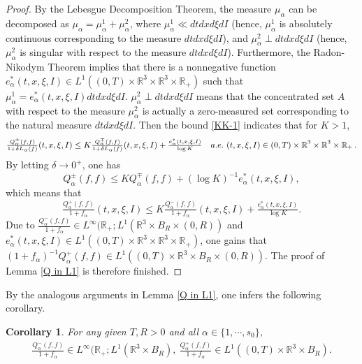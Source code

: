 \documentclass[reqno,11pt]{amsart}
\newtheorem{corollary}{Corollary}[section]
\numberwithin{equation}{section}
\def\R{\mathbb{R}}
\begin{document}
\begin{proof}
By the Lebesgue Decomposition Theorem, the measure $\mu_\alpha$ can be decomposed as $\mu_\alpha = \mu_\alpha^1 + \mu_\alpha^2$, where $\mu_\alpha^1 \ll d t d x d \xi d I$ (hence, $\mu_\alpha^1$ is absolutely continuous corresponding to the measure $ d t d x d \xi d I $), and $\mu_\alpha^2 \perp d t d x d \xi d I$ (hence, $\mu_\alpha^2$ is singular with respect to the measure $ d t d x d \xi d I $). Furthermore, the Radon-Nikodym Theorem implies that there is a nonnegative function $e_\alpha^* (t,x,\xi,I) \in L^1 ( (0,T) \times \R^3 \times \R^3 \times \R_+ )$ such that $ \mu_\alpha^1 = e_\alpha^* (t,x,\xi,I) d t d x d \xi d I $. $\mu_\alpha^2 \perp d t d x d \xi d I$ means that the concentrated set $A$ with respect to the measure $\mu_\alpha^2$ is actually a zero-measured set corresponding to the natural measure $d t d x d \xi d I$. Then the bound \eqref{KK-1} indicates that for $K > 1$,
\begin{equation*}{\small
  \begin{aligned}
    \tfrac{Q^\pm _{\alpha}(f,f)}{1+\delta L_{\alpha}(f)} (t,x,\xi,I) \leq K \tfrac{Q^\mp _{\alpha}(f,f)}{1+\delta L_{\alpha}(f)} (t,x,\xi,I) + \tfrac{e_\alpha^*(t,x,\xi,I)}{\log K} \quad a.e. \ (t,x,\xi,I) \in (0, T) \times \R^3 \times \R^3 \times \R_+ \,.
  \end{aligned}}
\end{equation*}
By letting $\delta \to 0^+$, one has
	\begin{equation}\label{AK-bnd}
		Q^\pm_\alpha (f,f) \leq K Q^\mp_\alpha (f,f) + ( \log K )^{-1} e_\alpha^* (t,x,\xi,I) ,
	\end{equation}
which means that
	\begin{equation*}
		\tfrac{Q^+_\alpha (f,f)}{1+f_\alpha}(t,x,\xi,I) \leq K \tfrac{Q^-_\alpha (f,f)}{1+f_\alpha}(t,x,\xi,I)+ \tfrac{e_\alpha^* (t,x,\xi,I)}{\log K}.
	\end{equation*}
Due to $\tfrac{Q^-_\alpha (f,f)}{1+f_\alpha}\in L^\infty(\R_+ ; L^1( \R^3 \times B_R \times (0,R))$ and $e_\alpha^* (t,x,\xi,I) \in L^1 ( (0,T) \times \R^3 \times \R^3 \times \R_+ )$, one gains that $(1+f_\alpha)^{-1}Q^+_\alpha (f,f)\in L^1((0,T)\times \R^3 \times B_R\times (0,R))$. The proof of Lemma \ref{Q in L1} is therefore finished.
\end{proof}

By the analogous arguments in Lemma \ref{Q in L1}, one infers the following corollary.

\begin{corollary}\label{Q-L-loc}
	For any given $T,R>0$ and all $\alpha \in \{1,\cdots,s_0\}$, 
	\begin{equation*}
		\begin{aligned}
		\tfrac{Q^-_\alpha (f,f)}{1+f_\alpha} \in L^\infty(\R_+;L^1( \R^3 \times B_R ),\ \tfrac{Q^+_\alpha (f,f)}{1+f_\alpha} \in L^1((0,T)\times \R^3 \times B_R ).
	\end{aligned}
	\end{equation*}
\end{corollary}
\end{document}
